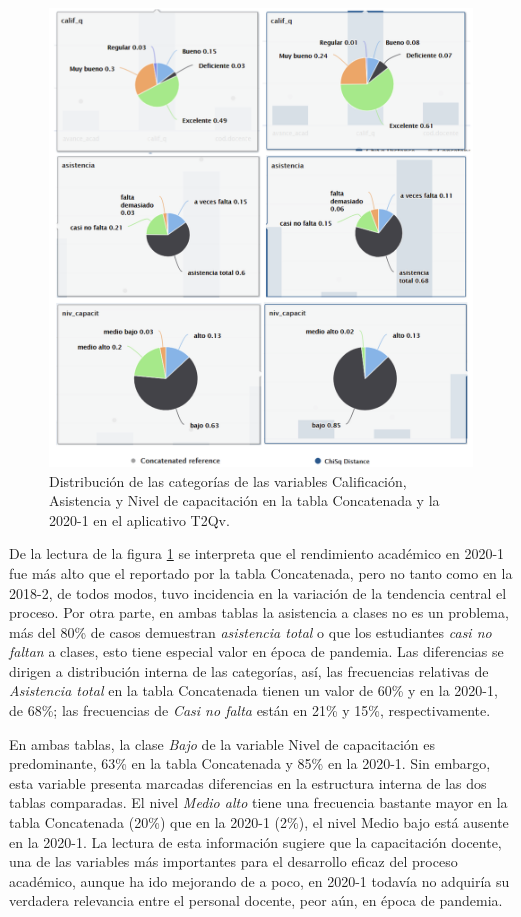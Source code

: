 \documentclass[mathematics,article,submit,moreauthors,pdftex]{mdpi}
\begin{document}
\begin{figure}[H]


\begin{center}\includegraphics[width=0.9\linewidth,]{dist20201n3} \end{center}

\caption{Distribución de las categorías de las variables Calificación, Asistencia y Nivel de capacitación en la tabla Concatenada y la 2020-1 en el aplicativo T2Qv.}
\label{fig:dist20201n3}
\end{figure}

De la lectura de la figura \ref{fig:dist20201n3} se interpreta que el
rendimiento académico en 2020-1 fue más alto que el reportado por la
tabla Concatenada, pero no tanto como en la 2018-2, de todos modos, tuvo
incidencia en la variación de la tendencia central el proceso. Por otra
parte, en ambas tablas la asistencia a clases no es un problema, más del
80\% de casos demuestran \emph{asistencia total} o que los estudiantes
\emph{casi no faltan} a clases, esto tiene especial valor en época de
pandemia. Las diferencias se dirigen a distribución interna de las
categorías, así, las frecuencias relativas de \emph{Asistencia total} en
la tabla Concatenada tienen un valor de 60\% y en la 2020-1, de 68\%;
las frecuencias de \emph{Casi no falta} están en 21\% y 15\%,
respectivamente.

En ambas tablas, la clase \emph{Bajo} de la variable Nivel de
capacitación es predominante, 63\% en la tabla Concatenada y 85\% en la
2020-1. Sin embargo, esta variable presenta marcadas diferencias en la
estructura interna de las dos tablas comparadas. El nivel \emph{Medio
alto} tiene una frecuencia bastante mayor en la tabla Concatenada (20\%)
que en la 2020-1 (2\%), el nivel Medio bajo está ausente en la 2020-1.
La lectura de esta información sugiere que la capacitación docente, una
de las variables más importantes para el desarrollo eficaz del proceso
académico, aunque ha ido mejorando de a poco, en 2020-1 todavía no
adquiría su verdadera relevancia entre el personal docente, peor aún, en
época de pandemia.
\end{document}
